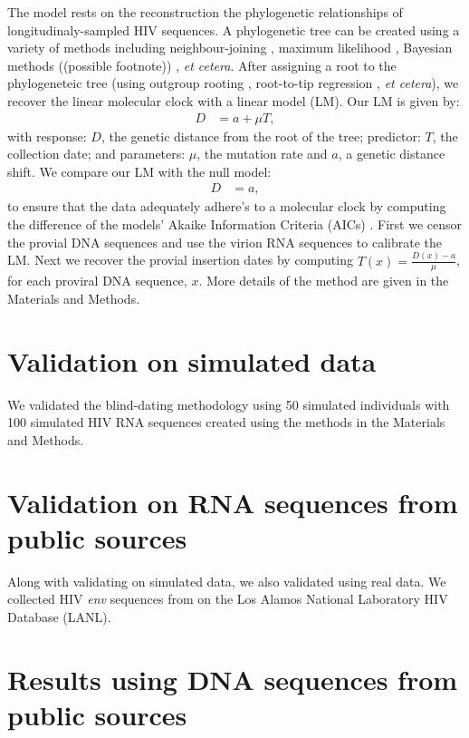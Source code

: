 \documentclass[12pt,onecolumn,twoside]{pnas-new}
\begin{document}
The model rests on the reconstruction the phylogenetic relationships of longitudinaly-sampled HIV sequences.
A phylogenetic tree can be created using a variety of methods including neighbour-joining \cite{Saitou87}, maximum likelihood \cite{fasttree,raxml}, Bayesian methods ((possible footnote)) \cite{beast}, \emph{et cetera}.
After assigning a root to the phylogeneteic tree (using outgroup rooting  \cite{Huelsenbeck02}, root-to-tip regression  \cite{Korber00}, \emph{et cetera}), we recover the linear molecular clock with a linear model (LM).
Our LM is given by:
\begin{align}
	D &= a + \mu T,\label{eq:glm}
\end{align}
with response: $D$, the genetic distance from the root of the tree; predictor: $T$, the collection date; and parameters: $\mu$, the mutation rate and $a$, a genetic distance shift.
We compare our LM with the null model:
\begin{align}
	D &= a,\label{eq:null}
\end{align}
to ensure that the data adequately adhere's to a molecular clock by computing the difference of the models' Akaike Information Criteria (AICs) \cite{Akaike74}.
First we censor the provial DNA sequences and use the virion RNA sequences to calibrate the LM.
Next we recover the provial insertion dates by computing $T(x) = \frac{D(x) - a}{\mu}$, for each proviral DNA sequence, $x$.
More details of the method are given in the Materials and Methods.

\section{Validation on simulated data}

We validated the blind-dating methodology using 50 simulated individuals with 100 simulated HIV RNA sequences created using the methods in the Materials and Methods.


\section{Validation on RNA sequences from public sources}

Along with validating on simulated data, we also validated using real data.
We collected HIV \emph{env} sequences from on the Los Alamos National Laboratory HIV Database (LANL).

\section{Results using DNA sequences from public sources}
\end{document}
